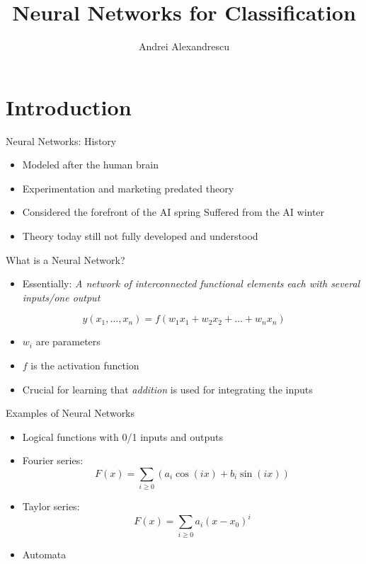 \documentclass[size=14pt,
  style=tycja,
  paper=screen,
  ]{powerdot}
\title{Neural Networks for Classification}
\author{Andrei Alexandrescu}
\begin{document}
\maketitle


\section{Introduction}

\begin{slide}{Neural Networks: History}
  \begin{itemize}
  \item Modeled after the human brain
  \item Experimentation and marketing predated theory
  \item Considered the forefront of the AI spring
    \subitem Suffered from the AI winter
  \item Theory today still not fully developed and understood
  \end{itemize}
\end{slide}

\begin{slide}{What is a Neural Network?}
  \begin{itemize}
  \item Essentially:
    \subitem \emph{A network of interconnected}
    \subitem \emph{functional elements}
    \subitem \emph{each with several inputs/one output}
  \end{itemize}
  \begin{equation}
    y(x_1,\ldots,x_n) = f(w_1x_1 + w_2x_2 + \ldots + w_nx_n)
  \end{equation}
  \begin{itemize}
    \item $w_i$ are parameters
    \item $f$ is the activation function
    \item Crucial for learning that \emph{addition} is used for integrating the inputs
  \end{itemize}
\end{slide}

\begin{slide}{Examples of Neural Networks}
  \begin{itemize}
  \item Logical functions with 0/1 inputs and outputs
  \item Fourier series:
    \begin{equation}
      F(x) = \displaystyle\sum_{i\geq 0}{(a_i \cos(ix) + b_i \sin(ix))}
    \end{equation}
  \item Taylor series:
    \begin{equation}
      F(x) = \displaystyle\sum_{i\geq 0} a_i(x - x_0)^i
    \end{equation}
  \item Automata
  \end{itemize}
\end{slide}
\end{document}
